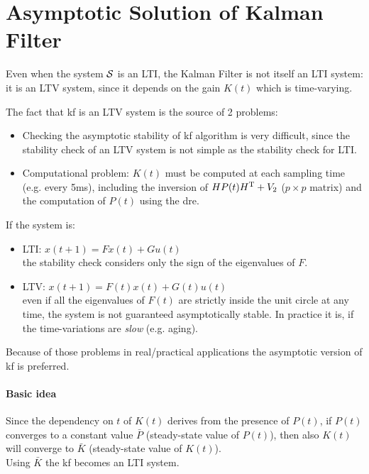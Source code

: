 \section{Asymptotic Solution of Kalman Filter}

\begin{obs} 
    Even when the system $\mathcal{S}$ is an LTI, the Kalman Filter is not itself an LTI system: it is an LTV system, since it depends on the gain $K(t)$ which is time-varying.
\end{obs}


The fact that \gls{kf} is an LTV system is the source of 2 problems:
\begin{itemize}
    \item Checking the asymptotic stability of \gls{kf} algorithm is very difficult, since the stability check of an LTV system is not simple as the stability check for LTI.
    \item Computational problem: $K(t)$ must be computed at each sampling time (e.g. every 5ms), including the inversion of $HP(t)H^{\mathrm{T}}+V_2$ ($p\times p$ matrix) and the computation of $P(t)$ using the \gls{dre}.
\end{itemize}

\begin{recall}

    If the system is: 
    \begin{itemize}
        \item LTI: $x(t+1) = Fx(t) + Gu(t)$ \\ 
        \qquad the stability check considers only the sign of the eigenvalues of $F$.

        \item LTV: $x(t+1) = F(t)x(t) + G(t)u(t)$ \\
        \qquad even if all the eigenvalues of $F(t)$ are strictly inside the unit circle at any time, the system is not guaranteed asymptotically stable.
        In practice it is, if the time-variations are \emph{slow} (e.g. aging).
    \end{itemize}

\end{recall}

Because of those problems in real/practical applications the asymptotic version of \gls{kf} is preferred.

\paragraph{Basic idea}
Since the dependency on $t$ of $K(t)$ derives from the presence of $P(t)$, if $P(t)$ converges to a constant value $\bar{P}$ (steady-state value of $P(t)$), then also $K(t)$ will converge to $\bar{K}$ (steady-state value of $K(t)$).
\\
Using $\bar{K}$ the \gls{kf} becomes an LTI system.

